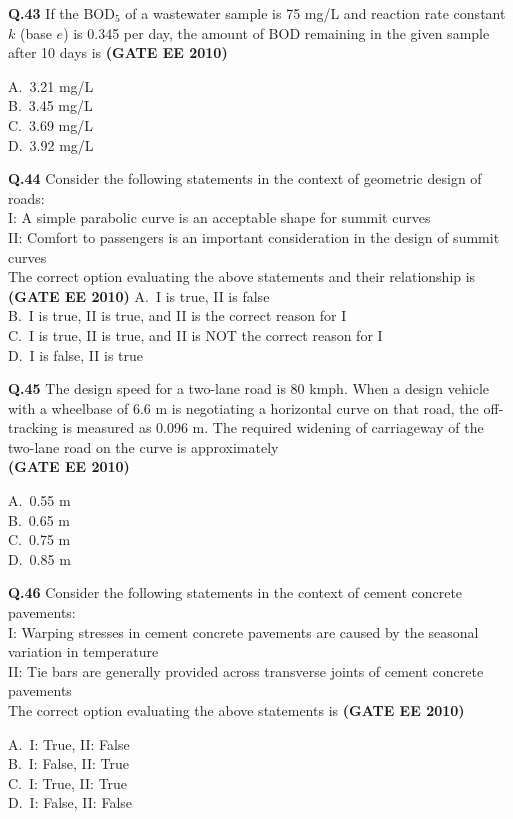 \documentclass[journal,12pt,onecolumn]{exam}
\theoremstyle{remark}
\begin{document}
\noindent\textbf{Q.43} If the BOD$_5$ of a wastewater sample is 75 mg/L and reaction rate constant $k$ (base $e$) is 0.345 per day, the amount of BOD remaining in the given sample after 10 days is
\hfill\textbf{(GATE EE 2010)}
\begin{multicols}{4}
A.\ 3.21 mg/L \\
B.\ 3.45 mg/L \\
C.\ 3.69 mg/L \\
D.\ 3.92 mg/L
\end{multicols}

\noindent\textbf{Q.44} Consider the following statements in the context of geometric design of roads: \\[0.1cm]
I: A simple parabolic curve is an acceptable shape for summit curves \\ 
II: Comfort to passengers is an important consideration in the design of summit curves \\[0.2cm]
The correct option evaluating the above statements and their relationship is
\hfill\textbf{(GATE EE 2010)}
A.\ I is true, II is false \\
B.\ I is true, II is true, and II is the correct reason for I \\
C.\ I is true, II is true, and II is NOT the correct reason for I \\
D.\ I is false, II is true

\noindent\textbf{Q.45} The design speed for a two-lane road is 80 kmph. When a design vehicle with a wheelbase of 6.6 m is negotiating a horizontal curve on that road, the off-tracking is measured as 0.096 m. The required widening of carriageway of the two-lane road on the curve is approximately
\\ \hfill\textbf{(GATE EE 2010)}
\begin{multicols}{4}
A.\ 0.55 m \\
B.\ 0.65 m \\
C.\ 0.75 m \\
D.\ 0.85 m
\end{multicols}

\noindent\textbf{Q.46} Consider the following statements in the context of cement concrete pavements: \\[0.1cm]
I: Warping stresses in cement concrete pavements are caused by the seasonal variation in temperature \\ 
II: Tie bars are generally provided across transverse joints of cement concrete pavements \\[0.2cm]
The correct option evaluating the above statements is
\hfill\textbf{(GATE EE 2010)}
\begin{multicols}{4}
A.\ I: True, II: False \\
B.\ I: False, II: True \\
C.\ I: True, II: True \\
D.\ I: False, II: False
\end{multicols}
\end{document}
